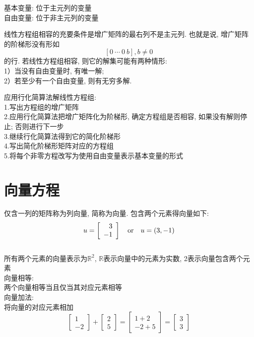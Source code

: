 基本变量: 位于主元列的变量\\
自由变量: 位于非主元列的变量\\[2ex]

\begin{TheoremTwo}[存在与唯一性定理]
线性方程组相容的充要条件是增广矩阵的最右列不是主元列. 也就是说, 增广矩阵的阶梯形没有形如
	\[[0\ \cdots\ 0\ b], b\neq 0\]
的行. 若线性方程组相容, 则它的解集可能有两种情形:\\
1）当没有自由变量时, 有唯一解;\\
2）若至少有一个自由变量, 则有无穷多解.
\end{TheoremTwo}\vspace{2ex}

应用行化简算法解线性方程组:\\
1.写出方程组的增广矩阵\\
2.应用行化简算法把增广矩阵化为阶梯形, 确定方程组是否相容, 如果没有解则停止; 否则进行下一步\\
3.继续行化简算法得到它的简化阶梯形\\
4.写出简化阶梯形矩阵对应的方程组\\
5.将每个非零方程改写为使用自由变量表示基本变量的形式
\newpage

\section{向量方程}
仅含一列的矩阵称为列向量, 简称为向量. 包含两个元素得向量如下:
\[u=\left[\begin{array}{r}
	3\\
	-1
\end{array}\right] \text{\quad or\quad} u=(3, -1)\]\\[1ex]
所有两个元素的向量表示为$\mathbb{R}^2$, $\mathbb{R}$表示向量中的元素为实数, 2表示向量包含两个元素\\[1ex]

向量相等:\\
两个向量相等当且仅当其对应元素相等\\[1ex]

向量加法:\\
将向量的对应元素相加
\begin{equation*}
\left[\begin{array}{c}
	1\\
	-2
\end{array}\right]
+
\left[\begin{array}{c}
	2\\
	5
\end{array}\right]
=
\left[\begin{array}{c}
	1+2\\
	-2+5
\end{array}\right]
=
\left[\begin{array}{c}
	3\\
	3
\end{array}\right]
\end{equation*}

